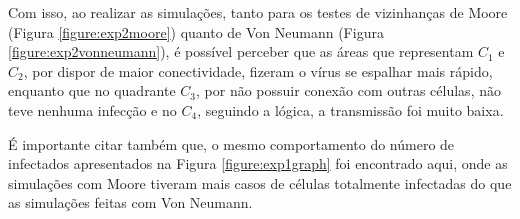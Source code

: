 \documentclass[a4paper,12pt]{article}
\begin{document}
Com isso, ao realizar as simulações, tanto para os testes de vizinhanças de Moore (Figura \ref{figure:exp2moore}) quanto de Von Neumann (Figura \ref{figure:exp2vonneumann}), é possível perceber que as áreas que representam $C_1$ e $C_2$, por dispor de maior conectividade, fizeram o vírus se espalhar mais rápido, enquanto que no quadrante $C_3$, por não possuir conexão com outras células, não teve nenhuma infecção e no $C_4$, seguindo a lógica, a transmissão foi muito baixa. 

\newpage
É importante citar também que, o mesmo comportamento do número de infectados apresentados na Figura \ref{figure:exp1graph} foi encontrado aqui, onde as simulações com Moore tiveram mais casos de células totalmente infectadas do que as simulações feitas com Von Neumann.

\begin{figure}[!ht]
\captionsetup[subfigure]{labelformat=empty}
\centering
{}
\qquad
{}
\qquad
{}
\qquad
{}

\end{figure}
\end{document}
